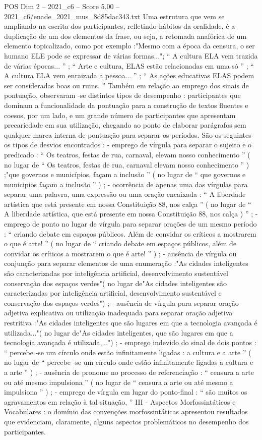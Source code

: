 \begin{textsample}{POS Dim 2 – 2021\_c6 – Score 5.00 – 2021\_c6/enade\_2021\_mus\_8d85dac343.txt}
Uma estrutura que vem se ampliando na escrita dos participantes, refletindo hábitos da oralidade, é a duplicação de um dos elementos da frase, ou seja, a retomada anafórica de um elemento topicalizado, como por exemplo :"Mesmo com a época da censura, o ser humano ELE pode se expressar de várias formas..."; “ A cultura ELA vem trazida de várias épocas... ” ; “ Arte e cultura, ELAS estão relacionadas em uma só ” ; “ A cultura ELA vem enraizada a pessoa... ” ; “ As ações educativas ELAS podem ser consideradas boas ou ruins. ” Também em relação ao emprego dos sinais de pontuação, observaram -se distintos tipos de desempenho : participantes que dominam a funcionalidade da pontuação para a construção de textos fluentes e coesos, por um lado, e um grande número de participantes que apresentam precariedade em sua utilização, chegando ao ponto de elaborar parágrafos sem qualquer marca interna de pontuação para separar os períodos.
São os seguintes os tipos de desvios encontrados : - emprego de vírgula para separar o sujeito e o predicado : “ Os teatros, festas de rua, carnaval, elevam nosso conhecimento ” ( no lugar de “ Os teatros, festas de rua, carnaval elevam nosso conhecimento ” ) ;"que governos e municípios, façam a inclusão ” ( no lugar de “ que governos e municipios façam a inclusão ” ) ; - ocorrência de apenas uma das vírgulas para separar uma palavra, uma expressão ou uma oração encaixada : “ A liberdade artística que está presente em nossa Constituição 88, nos calça ” ( no lugar de “ A liberdade artística, que está presente em nossa Constituição 88, nos calça ) ” ; - emprego de ponto no lugar de vírgula para separar orações de um mesmo período : “ criando debate em espaços públicos.
Além de convidar os críticos a mostrarem o que é arte! ” ( no lugar de “ criando debate em espaços públicos, além de convidar os críticos a mostrarem o que é arte! ” ) ; - ausência de vírgula ou conjunção para separar elementos de uma enumeração :"As cidades inteligentes são caracterizadas por inteligência artificial, desenvolvimento sustentável conservação dos espaços verdes"( no lugar de"As cidades inteligentes são caracterizadas por inteligência artificial, desenvolvimento sustentável e conservação dos espaços verdes") ; - ausência de vírgula para separar oração adjetiva explicativa ou utilização inadequada para separar oração adjetiva restritiva :"As cidades inteligentes que são lugares em que a tecnologia avançada é utilizada..."( no lugar de"As cidades inteligentes, que são lugares em que a tecnologia avançada é utilizada,...") ; - emprego indevido do sinal de dois pontos : “ percebe -se um círculo onde estão infinitamente ligadas : a cultura e a arte ” ( no lugar de “ percebe -se um círculo onde estão infinitamente ligadas a cultura e a arte ” ) ; - ausência de pronome no processo de referenciação : “ censura a arte ou até mesmo impulsiona ” ( no lugar de “ censura a arte ou até mesmo a impulsiona ” ) ; - emprego de vírgula em lugar do ponto-final : “ são muitos os agravamentos em relação à tal situação, ” III - Aspectos Morfossintáticos e Vocabulares : o domínio das convenções morfossintáticas apresentou resultados que evidenciam, claramente, alguns aspectos problemáticos no desempenho dos participantes.

\end{textsample}
